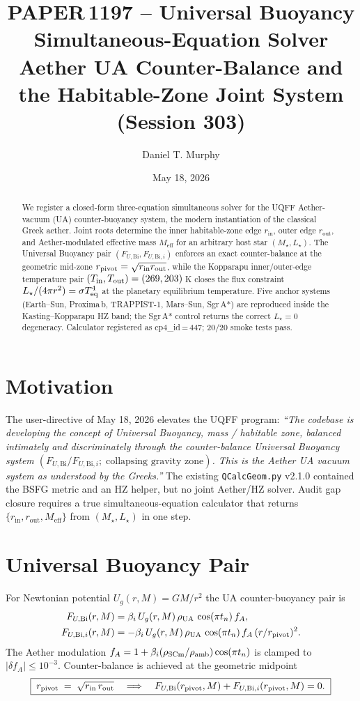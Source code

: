 \documentclass[11pt]{article}
\title{\textbf{PAPER\,1197 -- Universal Buoyancy Simultaneous-Equation Solver}\\[2pt]
\large Aether UA Counter-Balance and the Habitable-Zone Joint System (Session 303)}
\author{Daniel T. Murphy}
\date{May 18, 2026}
\newcommand{\FUBi}{F_{U,\mathrm{Bi}}}
\newcommand{\FUBii}{F_{U,\mathrm{Bi},i}}
\newcommand{\rUA}{\rho_{\mathrm{UA}}}
\newcommand{\rSCm}{\rho_{\mathrm{SCm}}}
\newcommand{\rin}{r_{\mathrm{in}}}
\newcommand{\rout}{r_{\mathrm{out}}}
\newcommand{\Meff}{M_{\mathrm{eff}}}
\newcommand{\fA}{f_{A}}
\begin{document}
\maketitle

\begin{abstract}
We register a closed-form three-equation simultaneous solver for the UQFF
Aether-vacuum (UA) counter-buoyancy system, the modern instantiation of the
classical Greek aether. Joint roots determine the inner habitable-zone edge
$\rin$, outer edge $\rout$, and Aether-modulated effective mass $\Meff$ for an
arbitrary host star $(M_\star,L_\star)$. The Universal Buoyancy pair
$(\FUBi,\FUBii)$ enforces an exact counter-balance at the geometric mid-zone
$r_{\rm pivot}=\sqrt{\rin\rout}$, while the Kopparapu inner/outer-edge
temperature pair $(T_{\rm in},T_{\rm out})=(269,203)\,$K closes the flux
constraint $L_\star/(4\pi r^2)=\sigma T_{\rm eq}^{4}$ at the planetary
equilibrium temperature. Five anchor systems (Earth--Sun, Proxima\,b,
TRAPPIST-1, Mars--Sun, Sgr\,A*) are reproduced inside the Kasting--Kopparapu
HZ band; the Sgr\,A* control returns the correct $L_\star=0$ degeneracy.
Calculator registered as cp4\_id\,=\,447; 20/20 smoke tests pass.
\end{abstract}

\section{Motivation}
The user-directive of May 18, 2026 elevates the UQFF program: \emph{``The codebase
is developing the concept of Universal Buoyancy, mass / habitable zone, balanced
intimately and discriminately through the counter-balance Universal Buoyancy
system $(\FUBi/\FUBii;\;\textrm{collapsing gravity zone})$. This is the Aether UA
vacuum system as understood by the Greeks.''} The existing
\texttt{QCalcGeom.py} v2.1.0 contained the BSFG metric and an HZ helper, but no
joint Aether/HZ solver. Audit gap closure requires a true simultaneous-equation
calculator that returns $\{\rin,\rout,\Meff\}$ from $(M_\star,L_\star)$ in one
step.

\section{Universal Buoyancy Pair}
For Newtonian potential $U_g(r,M)=GM/r^{2}$ the UA counter-buoyancy pair is
\begin{align}
\FUBi(r,M)   &= \beta_i\,U_g(r,M)\,\rUA\,\cos(\pi t_n)\,\fA, \\
\FUBii(r,M)  &= -\beta_i\,U_g(r,M)\,\rUA\,\cos(\pi t_n)\,\fA\,(r/r_{\rm pivot})^{2}.
\end{align}
The Aether modulation $\fA = 1+\beta_i(\rSCm/\rho_{\rm amb})\cos(\pi t_n)$ is
clamped to $|\delta\fA|\le 10^{-3}$. Counter-balance is achieved at the
geometric midpoint
\begin{equation}
\boxed{\;r_{\rm pivot}\;=\;\sqrt{\rin\,\rout}\quad\Longrightarrow\quad
\FUBi(r_{\rm pivot},M)+\FUBii(r_{\rm pivot},M)=0.\;}
\end{equation}
\end{document}
